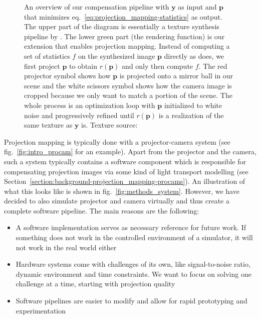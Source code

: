 \begin{figure}[]
    \centering
    \hspace*{-8mm}\hspace*{8mm}
    \caption{An overview of our compensation pipeline with \(\bm{y}\) as input and \(\bm{p}\) that minimizes eq.~\ref{eq:projection_mapping-statistics} as output. The upper part of the diagram is essentially a texture synthesis pipeline by \citet{Gatys2015}. The lower green part (the rendering function) is our extension that enables projection mapping. Instead of computing a set of statistics \(f\) on the synthesized image \(\bm{p}\) directly as \citet{Gatys2015} does, we first project \(\bm{p}\) to obtain \(r(\bm{p})\) and only then compute \(f\). The red projector symbol shows how \(\bm{p}\) is projected onto a mirror ball in our scene and the white scissors symbol shows how the camera image is cropped because we only want to match a portion of the scene. The whole process is an optimization loop with \(\bm{p}\) initialized to white noise and progressively refined until \(r(\bm{p})\) is a realization of the same texture as \(\bm{y}\) is. Texture source: \citet{Pixar128}}
    \label{fig:methods_pipeline}
\end{figure}

Projection mapping is typically done with a projector-camera system (see fig.~\ref{fig:intro_procam} for an example). Apart from the projector and the camera, such a system typically contains a software component which is responsible for compensating projection images via some kind of light transport modelling (see Section~\ref{section:background-projection_mapping-procams}). An illustration of what this looks like is shown in fig.~\ref{fig:methods_system}. However, we have decided to also simulate projector and camera virtually and thus create a complete software pipeline. The main reasons are the following:

\begin{itemize}
    \item A software implementation serves as necessary reference for future work. If something does not work in the controlled environment of a simulator, it will not work in the real world either
    \item Hardware systems come with challenges of its own, like signal-to-noise ratio, dynamic environment and time constraints. We want to focus on solving one challenge at a time, starting with projection quality
    \item Software pipelines are easier to modify and allow for rapid prototyping and experimentation
\end{itemize}

